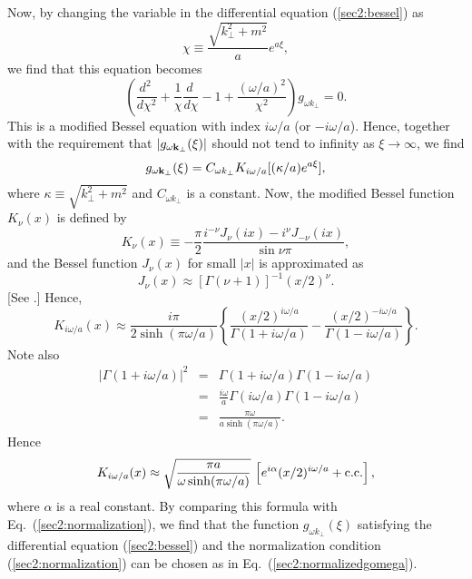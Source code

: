 \documentclass[12pt,nofootinbib,floatfix,aps,prd,showpacs,amsmath,amssymb,eqsecnum]{revtex4-2}
\begin{document}
Now, by changing the variable in the differential equation 
(\ref{sec2:bessel}) as
\begin{equation}
\chi \equiv \frac{\sqrt{k_\perp^2 + m^2}}{a}e^{a\xi},
\end{equation}
we find that this equation becomes
\begin{equation}
\left( \frac{d^2\ }{d\chi^2}
+\frac{1}{\chi}\frac{d\ }{d\chi} - 1 +
\frac{(\omega/a)^2}{\chi^2}\right) g_{\omega k_\perp} = 0.
\end{equation}
This is a modified Bessel equation with index $i\omega/a$ (or 
$-i\omega/a$).  Hence,
together with the requirement that 
$|g_{\omega{\bf k}_\perp}(\xi)|$ should not tend to infinity as 
$\xi \to \infty$, we find
\begin{equation}
g_{\omega{\bf k}_\perp}(\xi) = 
C_{\omega k_\perp}K_{i\omega/a}[ (\kappa/a) e^{a\xi}],
\end{equation}
where $\kappa \equiv \sqrt{k_\perp^2 + m^2}$ and 
$C_{\omega k_\perp}$ is a constant.  
Now, the modified Bessel function $K_\nu(x)$ is defined by
\begin{equation}
K_\nu(x) \equiv - \frac{\pi}{2}\frac{i^{-\nu}J_\nu(ix)
- i^\nu J_{-\nu}(ix)}{\sin\nu\pi},
\end{equation}
and the Bessel function $J_\nu(x)$ for small $|x|$ is approximated as
\begin{equation}
J_\nu(x)\approx [\Gamma(\nu+1)]^{-1} ({x}/{2})^\nu.
\end{equation}
[See \textcite{Gradshteynbook}.]  Hence,
\begin{equation}
K_{i\omega/a}(x) \approx \frac{i\pi}{2\sinh(\pi\omega/a)}\left\{
\frac{(x/2)^{i\omega/a}}{\Gamma(1+i\omega/a)} 
- \frac{(x/2)^{-i\omega/a}}{\Gamma(1-i\omega/a)}\right\}.
\label{appendixA:small-argumentK}
\end{equation}
Note also
\begin{eqnarray}
\left|\Gamma(1+i\omega/a)\right|^2 & = & 
\Gamma(1+i\omega/a)\Gamma(1-i\omega/a)\nonumber \\
& = & \frac{i\omega}{a}\Gamma(i\omega/a)\Gamma(1-i\omega/a)\nonumber \\
& = & \frac{\pi\omega}{a\sinh(\pi\omega/a)}.
\end{eqnarray}
Hence
\begin{equation}
K_{i\omega/a}(x) \approx \sqrt{\frac{\pi a}{\omega\sinh(\pi\omega/a)}}
\,\left[e^{i\alpha}(x/2)^{i\omega/a} + {\rm c.c.}\right],
\end{equation}
where $\alpha$ is a real constant.
By comparing this formula with Eq.~(\ref{sec2:normalization}), 
we find that the function $g_{\omega k_\perp}(\xi)$ satisfying the
differential equation (\ref{sec2:bessel}) and the normalization
condition (\ref{sec2:normalization}) can be chosen as in 
Eq.~(\ref{sec2:normalizedgomega}).


\end{document}
